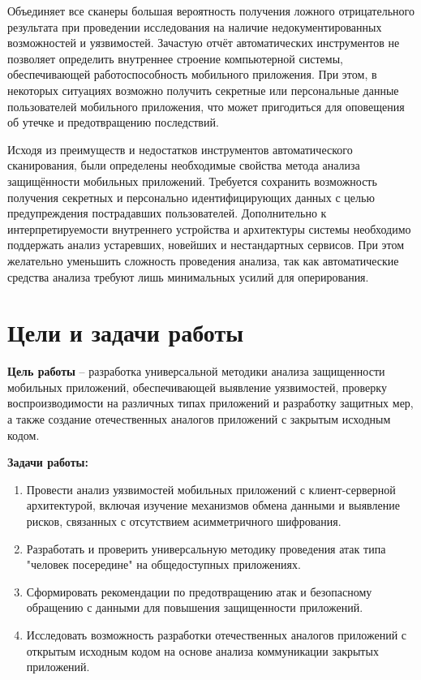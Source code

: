 Объединяет все сканеры большая вероятность получения ложного отрицательного результата при проведении исследования на наличие недокументированных возможностей и уязвимостей. Зачастую отчёт автоматических инструментов не позволяет определить внутреннее строение компьютерной системы, обеспечивающей работоспособность мобильного приложения. При этом, в некоторых ситуациях возможно получить секретные или персональные данные пользователей мобильного приложения, что может пригодиться для оповещения об утечке и предотвращению последствий.

Исходя из преимуществ и недостатков инструментов автоматического сканирования, были определены необходимые свойства метода анализа защищённости мобильных приложений. Требуется сохранить возможность получения секретных и персонально идентифицирующих данных с целью предупреждения пострадавших пользователей. Дополнительно к интерпретируемости внутреннего устройства и архитектуры системы необходимо поддержать анализ устаревших, новейших и нестандартных сервисов. При этом желательно уменьшить сложность проведения анализа, так как автоматические средства анализа требуют лишь минимальных усилий для оперирования.

\section{Цели и задачи работы}

\textbf{Цель работы} -- разработка универсальной методики анализа защищенности мобильных приложений, обеспечивающей выявление уязвимостей, проверку воспроизводимости на различных типах приложений и разработку защитных мер, а также создание отечественных аналогов приложений с закрытым исходным кодом.

\textbf{Задачи работы:}
\begin{enumerate}
\item Провести анализ уязвимостей мобильных приложений с клиент-серверной архитектурой, включая изучение механизмов обмена данными и выявление рисков, связанных с отсутствием асимметричного шифрования.
\item Разработать и проверить универсальную методику проведения атак типа "человек посередине" на общедоступных приложениях.
\item Сформировать рекомендации по предотвращению атак и безопасному обращению с данными для повышения защищенности приложений.
\item Исследовать возможность разработки отечественных аналогов приложений с открытым исходным кодом на основе анализа коммуникации закрытых приложений.
\end{enumerate}
